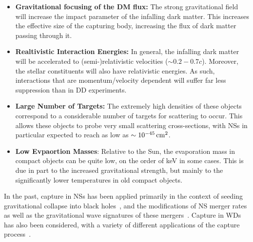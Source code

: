 \begin{itemize}
\item \textbf{Gravitational focusing of the DM flux:} The strong gravitational field will increase the impact parameter of the infalling dark matter. This increases the effective size of the capturing body, increasing the flux of dark matter passing through it. 

\item \textbf{Realtivistic Interaction Energies:} In general, the infalling dark matter will be accelerated to (semi-)relativistic velocities ($\sim 0.2 - 0.7 c$). Moreover, the stellar constituents will also have relativistic energies. As such, interactions that are momentum/velocity dependent will suffer far less suppression than in DD experiments. 

\item \textbf{Large Number of Targets:} The extremely high densities of these objects correspond to a considerable number of targets for scattering to occur. This allows these objects to probe very small scattering cross-sections, with NSs in particular expected to reach as low as $\sim 10^ {-45}{\rm \,cm}^2$. 

\item \textbf{Low Evpaortion Masses}: Relative to the Sun, the evaporation mass in compact objects can be quite low, on the order of keV in some cases. This is due in part to the increased gravitational strength, but mainly to the significantly lower temperatures in old compact objects. 
\end{itemize}

In the past, capture in NSs has been applied primarily in the context of seeding gravitational collapse into black holes~\cite{McDermott:2011jp_ConstraintsScalarAsymmetric,Kouvaris:2011fi_ExcludingLightAsymmetric,Guver:2012ba_may_Capturedarkmatter, Garani:2018kkd_may_NewAnalysisNeutron,Bramante:2013nma_jan_Boundsselfinteractingfermion,Bertoni:2013bsa_dec_DarkMatterThermalization,Bell:2013xk_jun_Realisticneutronstar}, and the modifications of NS merger rates as well as the gravitational wave signatures of these mergers~\cite{Bramante:2017ulk_mar_SearchingDarkMatter, Ellis:2017jgp_jun_SearchDarkMatter, Ellis:2018bkr_jun_DarkMatterEffects,Nelson:2018xtr_jul_Darkhalosneutron}. Capture in WDs has also been considered, with a variety of different applications of the capture process~\cite{Steigerwald:2019efv_dec_DarkMatterThermonuclear, Panotopoulos:2020kuo_jun_Constraintslightdark, McCullough:2010ai_CaptureInelasticDark, Hooper:2010es_InelasticDarkMatter, Bramante:2015cua_sep_Darkmatterignition, Bertone:2007ae_CompactStarsDark}. 

